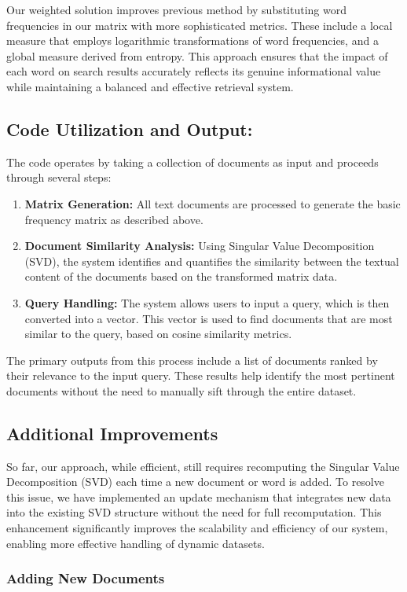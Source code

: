 \documentclass[12pt,a4paper]{article}
\begin{document}
\bigskip
\noindent Our weighted solution improves previous method by substituting word frequencies in our matrix with more sophisticated metrics. These include a local measure that employs logarithmic transformations of word frequencies, and a global measure derived from entropy. This approach ensures that the impact of each word on search results accurately reflects its genuine informational value while maintaining a balanced and effective retrieval system.


\subsection{Code Utilization and Output:}
\noindent The code operates by taking a collection of documents as input and proceeds through several steps:
\begin{enumerate}
    \item \textbf{Matrix Generation:} All text documents are processed to generate the basic frequency matrix as described above.
    \item \textbf{Document Similarity Analysis:} Using Singular Value Decomposition (SVD), the system identifies and quantifies the similarity between the textual content of the documents based on the transformed matrix data.
    \item \textbf{Query Handling:} The system allows users to input a query, which is then converted into a vector. This vector is used to find documents that are most similar to the query, based on cosine similarity metrics.
\end{enumerate}
The primary outputs from this process include a list of documents ranked by their relevance to the input query. These results help identify the most pertinent documents without the need to manually sift through the entire dataset.

\subsection{Additional Improvements}
So far, our approach, while efficient, still requires recomputing the Singular Value Decomposition (SVD) each time a new document or word is added. To resolve this issue, we have implemented an update mechanism that integrates new data into the existing SVD structure without the need for full recomputation. This enhancement significantly improves the scalability and efficiency of our system, enabling more effective handling of dynamic datasets.

\subsubsection{Adding New Documents}
\end{document}
